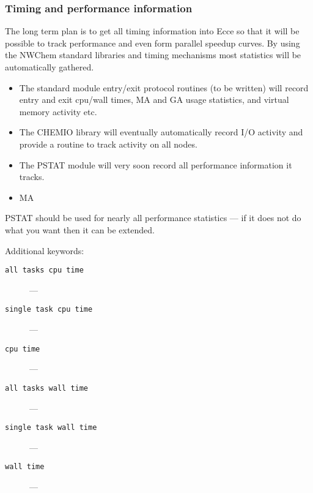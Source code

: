 \subsubsection{Timing and performance information}

The long term plan is to get all timing information into Ecce so that
it will be possible to track performance and even form parallel
speedup curves.  By using the NWChem standard libraries and timing
mechanisms most statistics will be automatically gathered.

\begin{itemize}
\item The standard module entry/exit protocol routines (to be written)
  will record entry and exit cpu/wall times, MA and GA usage
  statistics, and virtual memory activity etc.
\item The CHEMIO library will eventually automatically record I/O
  activity and provide a routine to track activity on all nodes.
\item The PSTAT module will very soon record all performance
  information it tracks.
\item MA 
\end{itemize}

PSTAT should be used for nearly all performance statistics --- if it
does not do what you want then it can be extended.

Additional keywords:
\begin{description}
\item [\verb+all tasks cpu time+] ---
\item [\verb+single task cpu time+] ---
\item [\verb+cpu time+] ---
\item [\verb+all tasks wall time+] ---
\item [\verb+single task wall time+] ---
\item [\verb+wall time+] ---
\end{description}


